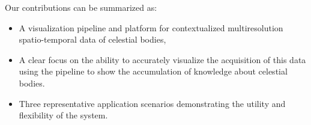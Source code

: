 \documentclass[journal]{vgtc}                %
\newcommand{\denselist}{\itemsep 0pt\parsep=1pt\partopsep 0pt}
\begin{document}
Our contributions can be summarized as:
\vspace*{-1.25mm}
\begin{itemize}\denselist
\item A visualization pipeline and platform for contextualized multiresolution spatio-temporal data of celestial bodies,
\item A clear focus on the ability to accurately visualize the acquisition of this data using the pipeline to show the accumulation of knowledge about celestial bodies.
\item Three representative application scenarios demonstrating the utility and flexibility of the system.
\end{itemize}

\vspace*{-2.25mm}
\end{document}
